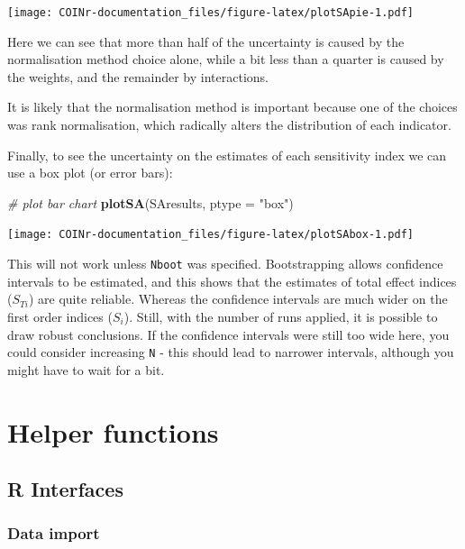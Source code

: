 \documentclass[
]{book}
\newenvironment{Shaded}{\begin{snugshade}}{\end{snugshade}}
\newcommand{\CommentTok}[1]{\textcolor[rgb]{0.56,0.35,0.01}{\textit{#1}}}
\newcommand{\DataTypeTok}[1]{\textcolor[rgb]{0.13,0.29,0.53}{#1}}
\newcommand{\KeywordTok}[1]{\textcolor[rgb]{0.13,0.29,0.53}{\textbf{#1}}}
\newcommand{\NormalTok}[1]{#1}
\newcommand{\StringTok}[1]{\textcolor[rgb]{0.31,0.60,0.02}{#1}}
\begin{document}
\texttt{[image: COINr-documentation\_files/figure-latex/plotSApie-1.pdf]}

Here we can see that more than half of the uncertainty is caused by the normalisation method choice alone, while a bit less than a quarter is caused by the weights, and the remainder by interactions.

It is likely that the normalisation method is important because one of the choices was rank normalisation, which radically alters the distribution of each indicator.

Finally, to see the uncertainty on the estimates of each sensitivity index we can use a box plot (or error bars):

\begin{Shaded}
\begin{Highlighting}[]
\CommentTok{# plot bar chart}
\KeywordTok{plotSA}\NormalTok{(SAresults, }\DataTypeTok{ptype =} \StringTok{"box"}\NormalTok{)}
\end{Highlighting}
\end{Shaded}

\texttt{[image: COINr-documentation\_files/figure-latex/plotSAbox-1.pdf]}

This will not work unless \texttt{Nboot} was specified. Bootstrapping allows confidence intervals to be estimated, and this shows that the estimates of total effect indices (\(S_{Ti}\)) are quite reliable. Whereas the confidence intervals are much wider on the first order indices (\(S_{i}\)). Still, with the number of runs applied, it is possible to draw robust conclusions. If the confidence intervals were still too wide here, you could consider increasing \texttt{N} - this should lead to narrower intervals, although you might have to wait for a bit.

\hypertarget{helper-functions}{%
\chapter{Helper functions}\label{helper-functions}}

\hypertarget{r-interfaces}{%
\section{R Interfaces}\label{r-interfaces}}

\hypertarget{data-import}{%
\subsection{Data import}\label{data-import}}
\end{document}
